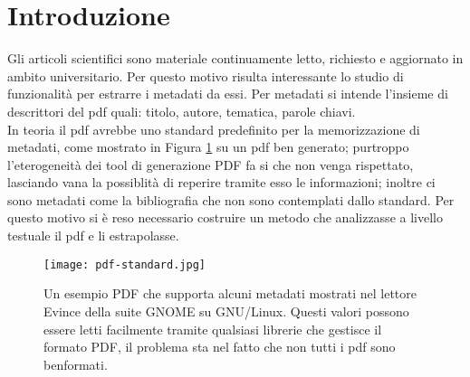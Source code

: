 \section{Introduzione}\label{intro}

Gli articoli scientifici sono materiale continuamente letto, richiesto e aggiornato in ambito universitario. Per questo motivo risulta interessante lo studio di funzionalità per estrarre i metadati da essi. Per metadati si intende l'insieme di descrittori del pdf quali: titolo, autore, tematica, parole chiavi.\\ In teoria il pdf avrebbe uno standard predefinito per la memorizzazione di metadati, come mostrato in Figura \ref{fig:standard} su un pdf ben generato; purtroppo l'eterogeneità dei tool di generazione PDF fa si che non venga rispettato, lasciando vana la possiblità di reperire tramite esso le informazioni; inoltre ci sono metadati come la bibliografia che non sono contemplati dallo standard. Per questo motivo si è reso necessario costruire un metodo che analizzasse a livello testuale il pdf e li estrapolasse.\\

\begin{figure}[htb]
\begin{center}
\texttt{[image: pdf-standard.jpg]}
\end{center}
\caption[Un esempio PDF che supporta alcuni metadati]{Un esempio PDF che supporta alcuni metadati mostrati nel lettore Evince della suite GNOME su GNU/Linux. Questi valori possono essere letti facilmente tramite qualsiasi librerie che gestisce il formato PDF, il problema sta nel fatto che non tutti i pdf sono benformati.}
\label{fig:standard}
\end{figure}


